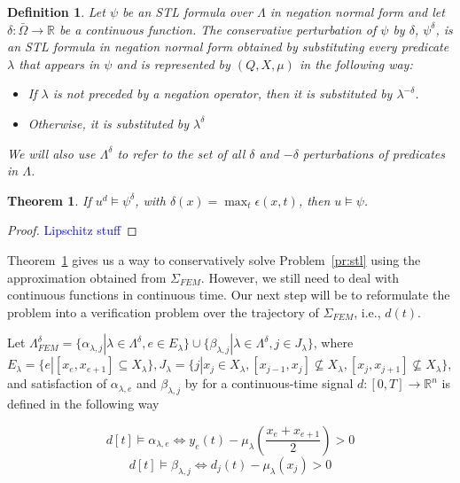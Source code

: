 \documentclass{article}
\newtheorem{theorem}{Theorem}
\newtheorem{definition}{Definition}
\newcommand*{\R}{\mathbb{R}}
\newcommand*{\fran}[1]{\textcolor{blue}{#1}}
\begin{document}
\begin{definition}
\label{def:delta_perturbation}
    Let $\psi$ be an STL formula over $\Lambda$ in negation normal form 
    and let $\delta : \bar\Omega \to \R$ be a continuous function. The
    conservative perturbation of $\psi$ by $\delta$, $\psi^\delta$, is an STL
    formula in negation normal form obtained by substituting every predicate
    $\lambda$ that appears in $\psi$ and is represented by $(Q, X, \mu)$ in the
    following way:

    \begin{itemize}
        \item If $\lambda$ is not preceded by a negation operator, then it is
            substituted by $\lambda^{-\delta}$.
        \item Otherwise, it is substituted by $\lambda^{\delta}$
    \end{itemize}

    We will also use $\Lambda^{\delta}$ to refer to the set of all $\delta$ and
    $-\delta$
    perturbations of predicates in $\Lambda$.
\end{definition}

\begin{theorem}
\label{th:epsilon_approximation}
    If $u^d \models \psi^{\delta}$, with $\delta(x) = \max_t \epsilon(x, t)$, then $u \models \psi$.
\end{theorem}
\begin{proof}
    \fran{Lipschitz stuff}
\end{proof}

Theorem~\ref{th:epsilon_approximation} gives us a way to conservatively solve
Problem~\ref{pr:stl} using the approximation obtained from $\Sigma_{FEM}$.
However, we still need to deal with continuous functions in continuous time. Our
next step will be to reformulate the problem into a verification problem over
the trajectory of $\Sigma_{FEM}$, i.e., $d(t)$.

Let $\Lambda^{\delta}_{FEM} = \{\alpha_{\lambda, j} | \lambda \in
\Lambda^{\delta}, e \in E_{\lambda}\} \cup \{\beta_{\lambda, j} | \lambda \in
\Lambda^{\delta}, j \in J_{\lambda}\}$, where $E_{\lambda} = \{e | [x_e, x_{e+1}] \subseteq
X_{\lambda}\}, J_{\lambda} = \{j | x_j \in X_\lambda, [x_{j-1}, x_j] \not\subseteq
X_\lambda, [x_{j}, x_{j+1}] \not\subseteq X_\lambda \}$,
and satisfaction of $\alpha_{\lambda, e}$ and $\beta_{\lambda, j}$ by 
for a continuous-time signal $d : [0, T] \to \R^n$
is defined in the following way  

\begin{equation}
    d[t] \models \alpha_{\lambda, e} \iff y_e(t) - 
    \mu_\lambda(\frac{x_e + x_{e + 1}}{2}) > 0 
\end{equation}
\begin{equation}
     d[t] \models \beta_{\lambda, j} \iff d_j(t) - \mu_\lambda(x_j) > 0
\end{equation}
\end{document}
